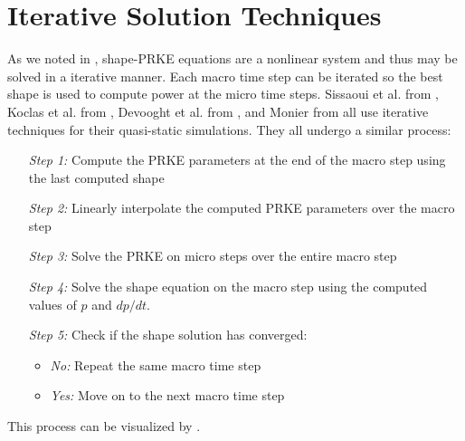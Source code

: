 \section{Iterative Solution Techniques}
\label{sect:iter}

As we noted in , shape-PRKE equations are a nonlinear system and thus may be solved in a iterative manner.  Each macro time step can be iterated so the best shape is used to compute power at the micro time steps. Sissaoui et al. from \cite{Sissaoui_1995}, Koclas et al. from \cite{Koclas_1996}, Devooght et al. from \cite{Devooght_1984}, and Monier from \cite{Monier_diss} all use iterative techniques for their quasi-static simulations.  They all undergo a similar process:
\begin{itemize}
\item[\textit{Step 1:}] Compute the PRKE parameters at the end of the macro step using the last computed shape
\item[\textit{Step 2:}] Linearly interpolate the computed PRKE parameters over the macro step
\item[\textit{Step 3:}] Solve the PRKE on micro steps over the entire macro step
\item[\textit{Step 4:}] Solve the shape equation on the macro step using the computed values of $p$ and $dp/dt$.
\item[\textit{Step 5:}] Check if the shape solution has converged:
	\begin{itemize}
	\item \textit{No:} Repeat the same macro time step
	\item \textit{Yes:} Move on to the next macro time step
	\end{itemize}
\end{itemize}
This process can be visualized by .
